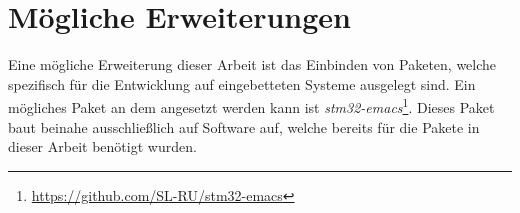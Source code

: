 \section{Mögliche Erweiterungen}
\label{sec:erweiterungen}
Eine mögliche Erweiterung dieser Arbeit ist das Einbinden von Paketen,
welche spezifisch für die Entwicklung auf eingebetteten Systeme
ausgelegt sind. Ein mögliches Paket an dem angesetzt werden kann ist
\textit{stm32-emacs}\footnote{\url{https://github.com/SL-RU/stm32-emacs}}. Dieses
Paket baut beinahe ausschließlich auf Software auf, welche bereits für
die Pakete in dieser Arbeit benötigt wurden.
